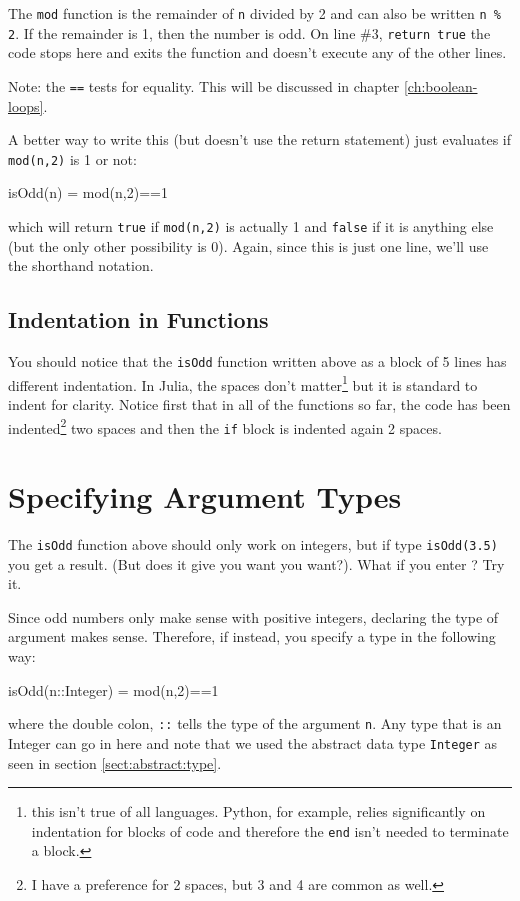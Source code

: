 The \texttt{mod} function is the remainder of \texttt{n} divided by 2 and can also be written \verb!n % 2!. If the remainder is 1, then the number is odd. On line \#3, \texttt{return\ true} the code stops here and exits the function and doesn't execute any of the other lines.

Note: the \texttt{==} tests for equality. This will be discussed in chapter \ref{ch:boolean-loops}. 

A better way to write this (but doesn't use the return statement) just evaluates if \texttt{mod(n,2)} is 1 or not:
%
\begin{jlblock}[functions]
isOdd(n) =  mod(n,2)==1
\end{jlblock}
%
which will return \texttt{true} if \texttt{mod(n,2)} is actually 1 and \texttt{false} if it is anything else (but the only other possibility is 0). Again, since this is just one line, we'll use the shorthand notation. 


\subsection{Indentation in Functions}

You should notice that the \texttt{isOdd} function written above as a block of 5 lines has different indentation.  In Julia, the spaces don't matter\footnote{this isn't true of all languages.  Python, for example, relies significantly on indentation for blocks of code and therefore the \texttt{end} isn't needed to terminate a block.} but it is standard to indent for clarity.  Notice first that in all of the functions so far, the code has been indented\footnote{I have a preference for 2 spaces, but 3 and 4 are common as well.} two spaces and then the \texttt{if} block is indented again 2 spaces. 

\section{Specifying Argument Types}

The \texttt{isOdd} function above should only work on integers, but if type \texttt{isOdd(3.5)} you get a result. (But does it give you want you want?). What if you enter ? Try it. 

Since odd numbers only make sense with positive integers, declaring the type of argument makes sense.  Therefore, if instead, you specify a type in the following way:
%
\begin{jlblock}[functions2]
isOdd(n::Integer) = mod(n,2)==1
\end{jlblock}
%
where the double colon, \verb!::! tells the type of the argument \verb!n!.  Any type that is an Integer can go in here and note that we used the abstract data type \verb!Integer! as seen in section \ref{sect:abstract:type}. 

